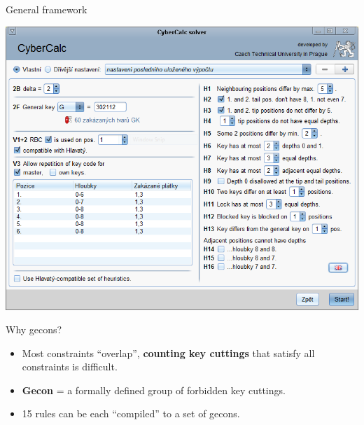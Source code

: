 \begin{frame}{General framework}
  \begin{minipage}[t][180pt][t]{.4\textwidth}
    \bigskip

    \includegraphics[width=\textwidth]{Constraints.png}
  \end{minipage}
  \begin{minipage}[t][180pt][t]{.55\textwidth}
    \begin{block}{Why gecons?}
      \begin{itemize}
        \item Most constraints “overlap”, \textbf{counting key cuttings} that satisfy all constraints is difficult.
        \item \textbf{Gecon} = a formally defined group of forbidden key cuttings.
        \item 15 rules can be each “compiled” to a set of gecons.
      \end{itemize}
    \end{block}
  \end{minipage}
\end{frame}

